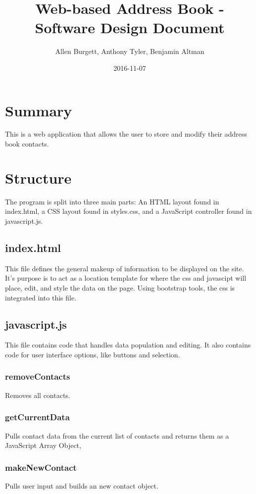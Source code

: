 \documentclass{article}
\title{Web-based Address Book - Software Design Document}
\date{2016-11-07}
\author{Allen Burgett, Anthony Tyler, Benjamin Altman}
\begin{document}
\maketitle
\pagebreak


\section{Summary}
This is a web application that allows the user to store and modify their address book contacts.

\section{Structure}
The program is split into three main parts: An HTML layout found in index.html, a CSS layout found in styles.css, and a JavaScript controller found in javascript.js.

\subsection{index.html}
This file defines the general makeup of information to be displayed on the site. It's purpose is to act as a location template for where the css and javascipt will place, edit, and style the data on the page. Using bootstrap tools, the css is integrated into this file. 

\subsection{javascript.js}
This file contains code that handles data population and editing. It also contains code for user interface options, like buttons and selection. 

\subsubsection{removeContacts}
Removes all contacts.

\subsubsection{getCurrentData}
Pulls contact data from the current list of contacts and returns them as a JavaScript Array Object,

\subsubsection{makeNewContact}
Pulls user input and builds an new contact object. 
\end{document}
